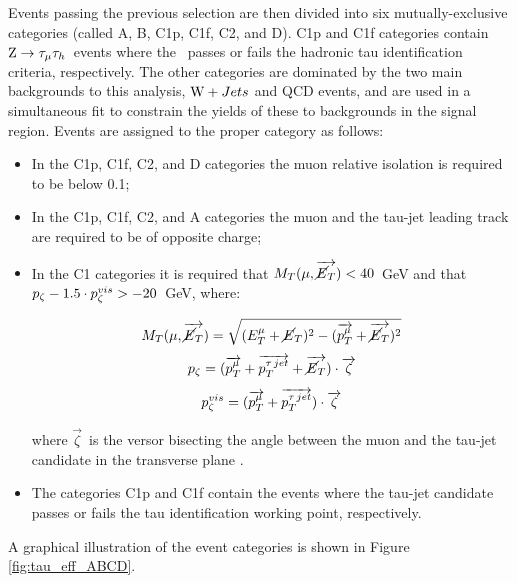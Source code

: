 Events passing the previous selection are then divided into six mutually-exclusive categories (called A, B, C1p, C1f, C2, and D). C1p and C1f categories contain $\mathrm{Z}\rightarrow\tau_\mu\tau_h$\ events where the \tauh\ passes or fails the hadronic tau identification criteria, respectively. The other categories are dominated by the two main backgrounds to this analysis, $\mathrm{W}+Jets$ and QCD events, and are used in a simultaneous fit to constrain the yields of these to backgrounds in the signal region.
Events are assigned to the proper category as follows: %
\begin{itemize}
\item In the C1p, C1f, C2, and D categories the muon relative isolation is required to be below 0.1;
\item In the C1p, C1f, C2, and A categories the muon and the tau-jet leading track are required to be of opposite charge;
\item In the C1 categories it is required that $M_T(\mu, \overrightarrow{\cancel{E}_T}) < 40$\ GeV and that $p_\zeta -1.5 \cdot p_\zeta^{vis} > -20$\ GeV, where:

\begin{equation}
 M_T(\mu, \overrightarrow{\cancel{E}_T}) = \sqrt{(E_{T}^\mu+\cancel{E}_T)^2 - (\overrightarrow{p_{T}^\mu}+\overrightarrow{\cancel{E}_T})^2}
\end{equation}
\begin{equation}
 p_\zeta = (\overrightarrow{p_{T}^\mu} + \overrightarrow{p_{T}^{\tau\,jet}} + \overrightarrow{\cancel{E}_T}) \cdot \overrightarrow{\zeta}
\end{equation}
\begin{equation}
 p_\zeta^{vis} = (\overrightarrow{p_{T}^\mu} + \overrightarrow{p_{T}^{\tau\,jet}}) \cdot \overrightarrow{\zeta}
\end{equation}

where $\vec{\zeta}$\ is the versor bisecting the angle between the muon and the tau-jet candidate in the transverse plane \cite{CDFrefPzeta}.%
\item The categories C1p and C1f contain the events where the tau-jet candidate passes or fails the tau identification working point, respectively.
\end{itemize}

A graphical illustration of the event categories is shown in Figure \ref{fig:tau_eff_ABCD}.

